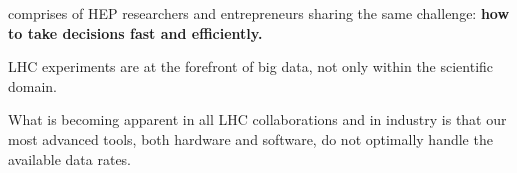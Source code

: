 \acronym comprises of HEP researchers and entrepreneurs sharing the same challenge: \textbf{how to take decisions fast and efficiently.}




LHC experiments are at the forefront of big data, not only within the scientific domain.



\vskip2pt
What is becoming apparent in all LHC collaborations and in industry is that our most advanced tools, both hardware and software, do not optimally handle the available data rates. 

